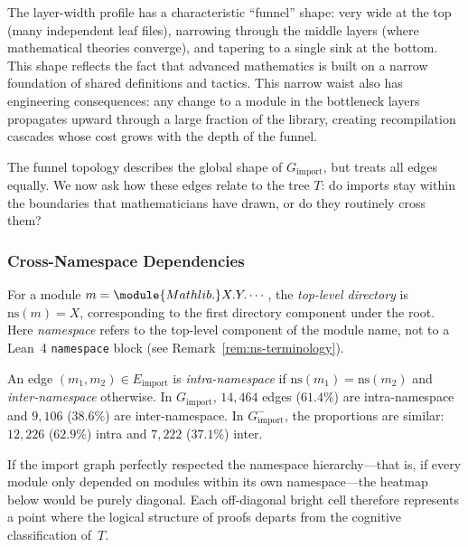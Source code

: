 \begin{remark}
The layer-width profile has a characteristic ``funnel'' shape: very wide at the top (many independent leaf files), narrowing through the middle layers (where mathematical theories converge), and tapering to a single sink at the bottom. This shape reflects the fact that advanced mathematics is built on a narrow foundation of shared definitions and tactics. This narrow waist also has engineering consequences: any change to a module in the bottleneck layers propagates upward through a large fraction of the library, creating recompilation cascades whose cost grows with the depth of the funnel.
\end{remark}

The funnel topology describes the global shape of $G_{\mathrm{import}}$, but treats all edges equally. We now ask how these edges relate to the tree $T$: do imports stay within the boundaries that mathematicians have drawn, or do they routinely cross them?

\subsubsection{Cross-Namespace Dependencies}
\label{sec:cross-namespace}

\begin{definition}
For a module $m = \module{Mathlib.}X.Y.\cdots$, the \emph{top-level directory} is $\mathrm{ns}(m) = X$, corresponding to the first directory component under the  root. Here \emph{namespace} refers to the top-level component of the module name, not to a Lean~4 \texttt{namespace} block (see Remark~\ref{rem:ns-terminology}).
\end{definition}

An edge $(m_1, m_2) \in E_{\mathrm{import}}$ is \emph{intra-namespace} if $\mathrm{ns}(m_1) = \mathrm{ns}(m_2)$ and \emph{inter-namespace} otherwise. In $G_{\mathrm{import}}$, $14{,}464$ edges ($61.4\%$) are intra-namespace and $9{,}106$ ($38.6\%$) are inter-namespace. In $G_{\mathrm{import}}^{-}$, the proportions are similar: $12{,}226$ ($62.9\%$) intra and $7{,}222$ ($37.1\%$) inter.

If the import graph perfectly respected the namespace hierarchy---that is, if every module only depended on modules within its own namespace---the heatmap below would be purely diagonal. Each off-diagonal bright cell therefore represents a point where the logical structure of proofs departs from the cognitive classification of~$T$.

